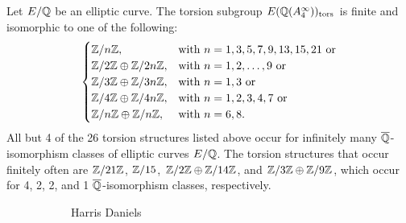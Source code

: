 \begin{frame}[plain]
\footnotesize
\begin{thm}
Let $E/\mathbb{Q}$ be an elliptic curve. The torsion subgroup $E(\mathbb{Q}(A_4^\infty))_{\text{tors}}$ is finite and isomorphic to one of the following:
	\[
	\begin{cases}
	\mathbb{Z}/n\mathbb{Z}, & \text{with } n= 1, 3, 5, 7, 9, 13, 15, 21 \text{ or} \\
	\mathbb{Z}/2\mathbb{Z} \oplus \mathbb{Z}/2n\mathbb{Z}, & \text{with } n= 1, 2, \ldots, 9 \text{ or} \\
	\mathbb{Z}/3\mathbb{Z} \oplus \mathbb{Z}/3n\mathbb{Z}, & \text{with } n= 1, 3 \text{ or} \\
	\mathbb{Z}/4\mathbb{Z} \oplus \mathbb{Z}/4n\mathbb{Z}, & \text{with } n= 1, 2, 3, 4, 7 \text{ or} \\
	\mathbb{Z}/n\mathbb{Z} \oplus \mathbb{Z}/n\mathbb{Z}, & \text{with } n= 6, 8.
	\end{cases}
	\]
All but 4 of the 26 torsion structures listed above occur for infinitely many $\overline{\mathbb{Q}}$-isomorphism classes of elliptic curves $E/\mathbb{Q}$. The torsion structures that occur finitely often are $\mathbb{Z}/21\mathbb{Z}$, $\mathbb{Z}/15$, $\mathbb{Z}/2\mathbb{Z} \oplus \mathbb{Z}/14\mathbb{Z}$, and $\mathbb{Z}/3\mathbb{Z} \oplus \mathbb{Z}/9\mathbb{Z}$, which occur for 4, 2, 2, and 1 $\overline{\mathbb{Q}}$-isomorphism classes, respectively.  
\end{thm}
	\begin{figure}[h]
	\centering
	\begin{subfigure}{0.30\textwidth}
	\captionsetup{labelformat=empty}
	\centering
	\caption{\scriptsize Harris Daniels}
	\end{subfigure}
	\begin{subfigure}{0.30\textwidth}
	\captionsetup{labelformat=empty}
	\centering

\end{subfigure}
\end{figure}
\end{frame}
